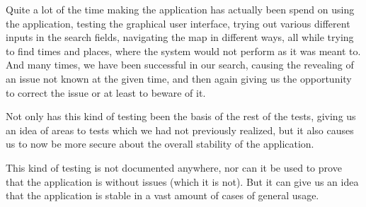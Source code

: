 Quite a lot of the time making the application has actually been spend on using the application, testing the graphical user interface, trying out various different inputs in the search fields, navigating the map in different ways, all while trying to find times and places, where the system would not perform as it was meant to. And many times, we have been successful in our search, causing the revealing of an issue not known at the given time, and then again giving us the opportunity to correct the issue or at least to beware of it.

Not only has this kind of testing been the basis of the rest of the tests, giving us an idea of areas to tests which we had not previously realized, but it also causes us to now be more secure about the overall stability of the application.

This kind of testing is not documented anywhere, nor can it be used to prove that the application is without issues (which it is not). But it can give us an idea that the application is stable in a vast amount of cases of general usage.